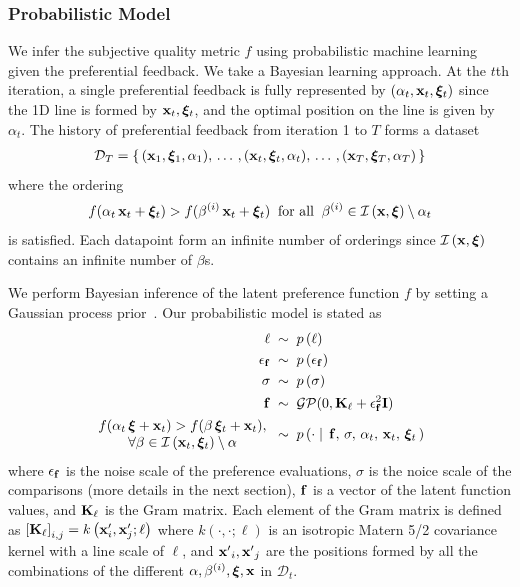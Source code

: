 \subsubsection{Probabilistic Model}
We infer the subjective quality metric \(f\) using probabilistic machine learning given the preferential feedback.
We take a Bayesian learning approach.
At the \(t\)th iteration, a single preferential feedback is fully represented by \((\alpha_t, \mathbf{x}_t, \bm{\xi}_t)\) since the 1D line is formed by \(\mathbf{x}_t, \bm{\xi}_t\), and the optimal position on the line is given by \(\alpha_t\).
The history of preferential feedback from iteration 1 to \(T\) forms a dataset
%
\begin{align}
  \mathcal{D}_T = \{\,(\mathbf{x}_1, \bm{\xi}_1, \alpha_1),\, \ldots\,, (\mathbf{x}_t, \bm{\xi}_t, \alpha_t),\,\ldots\,, (\mathbf{x}_T, \bm{\xi}_T, \alpha_T) \,\}
\end{align}
%
where the ordering
\begin{align}
f(\alpha_t\,\mathbf{x}_t + \bm{\xi}_t ) > f(\beta^{(i)}\,\mathbf{x}_t + \bm{\xi}_t) \;\;\text{for all}\;\; \beta^{(i)} \in \mathcal{I}\left(\mathbf{x}, \bm{\xi}\right) \setminus \alpha_t \label{eq:likelihood}
\end{align}
is satisfied.
Each datapoint form an infinite number of orderings since \(\mathcal{I}\left(\mathbf{x}, \bm{\xi}\right)\) contains an infinite number of \(\beta\)s.

We perform Bayesian inference of the latent preference function \(f\) by setting a Gaussian process prior~\cite{rasmussen_gaussian_2006}.
Our probabilistic model is stated as 
%
\begin{align}
\ell          \;&\sim \; p\,(\ell) \nonumber\\
\epsilon_{\mathbf{f}} \;&\sim \; p\,(\epsilon_{\mathbf{f}}) \nonumber\\
\sigma        \;&\sim \; p\,(\sigma) \nonumber\\
\mathbf{f}           \;&\sim \; \mathcal{GP}(0, \mathbf{K}_{\ell} + \epsilon_{\mathbf{f}}^2\mathbf{I}) \nonumber\\
\begin{matrix}
\; f(\alpha_t\,\bm{\xi} + \mathbf{x}_t) > f(\beta\,\bm{\xi}_t + \mathbf{x}_t), \; \\
\; \forall\beta \in \mathcal{I}\left(\mathbf{x}_t, \bm{\xi}_t\right) \setminus \alpha \;
\end{matrix}\; &\sim \; p\left(\cdot \mid\, \mathbf{f},\, \sigma,\, \alpha_t,\, \mathbf{x}_t,\, \bm{\xi}_t\,\right) \nonumber 
\end{align}
%
{\noindent}where \(\epsilon_{\mathbf{f}}\) is the noise scale of the preference evaluations, \(\sigma\) is the noice scale of the comparisons (more details in the next section), \(\mathbf{f}\) is a vector of the latent function values, and \(\mathcal{\mathbf{K}}_{\ell}\) is the Gram matrix.
Each element of the Gram matrix is defined as
\(
  {[\mathbf{K}_{\ell}]}_{i,j} = k\left(\mathbf{x}^\prime_i, \mathbf{x}^\prime_j; \ell \right)
\)
where \(k\left(\cdot, \cdot; \ell \right)\) is an isotropic Matern 5/2 covariance kernel with a line scale of \(\ell\), and \({\mathbf{x}^\prime}_i, {\mathbf{x}^\prime}_j\) are the positions formed by all the combinations of the different \(\alpha, \beta^{(i)}, \bm{\xi}, \mathbf{x}\) in \(\mathcal{D}_t\).

